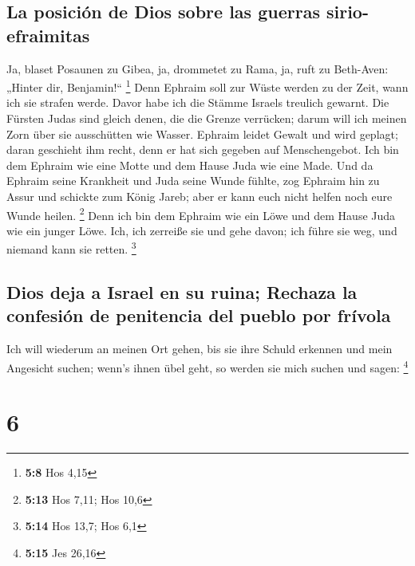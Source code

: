 \hypertarget{la-posiciuxf3n-de-dios-sobre-las-guerras-sirio-efraimitas}{%
\subsection{La posición de Dios sobre las guerras
sirio-efraimitas}\label{la-posiciuxf3n-de-dios-sobre-las-guerras-sirio-efraimitas}}

 Ja, blaset Posaunen zu Gibea, ja, drommetet zu Rama, ja,
ruft zu Beth-Aven: „Hinter dir, Benjamin!{}`` \footnote{\textbf{5:8} Hos
  4,15}  Denn Ephraim soll zur Wüste werden zu der Zeit,
wann ich sie strafen werde. Davor habe ich die Stämme Israels treulich
gewarnt.  Die Fürsten Judas sind gleich denen, die die
Grenze verrücken; darum will ich meinen Zorn über sie ausschütten wie
Wasser.  Ephraim leidet Gewalt und wird geplagt; daran
geschieht ihm recht, denn er hat sich gegeben auf Menschengebot.
 Ich bin dem Ephraim wie eine Motte und dem Hause Juda
wie eine Made.  Und da Ephraim seine Krankheit und Juda
seine Wunde fühlte, zog Ephraim hin zu Assur und schickte zum König
Jareb; aber er kann euch nicht helfen noch eure Wunde heilen.
\footnote{\textbf{5:13} Hos 7,11; Hos 10,6}  Denn ich bin
dem Ephraim wie ein Löwe und dem Hause Juda wie ein junger Löwe. Ich,
ich zerreiße sie und gehe davon; ich führe sie weg, und niemand kann sie
retten. \footnote{\textbf{5:14} Hos 13,7; Hos 6,1}

\hypertarget{dios-deja-a-israel-en-su-ruina-rechaza-la-confesiuxf3n-de-penitencia-del-pueblo-por-fruxedvola}{%
\subsection{Dios deja a Israel en su ruina; Rechaza la confesión de
penitencia del pueblo por
frívola}\label{dios-deja-a-israel-en-su-ruina-rechaza-la-confesiuxf3n-de-penitencia-del-pueblo-por-fruxedvola}}

 Ich will wiederum an meinen Ort gehen, bis sie ihre
Schuld erkennen und mein Angesicht suchen; wenn's ihnen übel geht, so
werden sie mich suchen und sagen: \footnote{\textbf{5:15} Jes 26,16}

\hypertarget{section-5}{%
\section{6}\label{section-5}}

